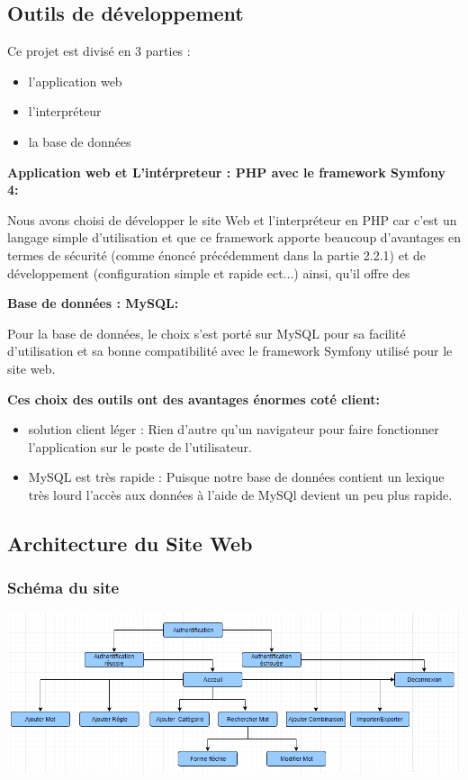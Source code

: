\documentclass[12pt,a4paper]{article}
\begin{document}
\subsection{Outils de développement}

Ce projet est divisé en 3 parties :
\begin{itemize}  
  \item l'application web
  \item l'interpréteur
  \item la base de données
\end{itemize}

\textbf{Application web et L'intérpreteur : PHP avec le framework Symfony 4:}

Nous avons choisi de développer le site Web et l'interpréteur en PHP car c'est un langage simple d'utilisation et que ce framework apporte beaucoup d'avantages en termes de sécurité (comme énoncé précédemment dans la partie 2.2.1) et de développement (configuration simple et rapide ect...) ainsi, qu'il offre des 

\smallbreak

\textbf{Base de données : MySQL:}


Pour la base de données, le choix s'est porté sur MySQL pour sa facilité d'utilisation et sa bonne compatibilité avec le framework Symfony utilisé pour le site web. 


\textbf{Ces choix des outils ont des avantages énormes coté client:}

\begin{itemize}  
  \item solution client léger : Rien d'autre qu'un navigateur pour faire fonctionner l'application sur le poste de l'utilisateur.
  \item MySQL est très rapide : Puisque notre base de données contient un lexique très lourd l'accès aux données à l'aide de MySQl devient un peu plus rapide.
\end{itemize}

\subsection{ Architecture du Site Web }
\subsubsection{Schéma du site} 

\begin{center}\includegraphics[width=150mm]{img/site.PNG}
\end{center}
\end{document}
